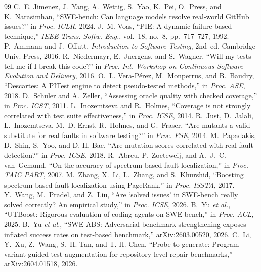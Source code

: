\documentclass[conference]{IEEEtran}
\begin{document}

\begin{thebibliography}{99}
 C.~E. Jimenez, J.~Yang, A.~Wettig, S.~Yao, K.~Pei, O.~Press, and K.~Narasimhan, ``SWE-bench: Can language models resolve real-world GitHub issues?'' in \emph{Proc. ICLR}, 2024.
 J.~M. Voas, ``PIE: A dynamic failure-based technique,'' \emph{IEEE Trans. Softw. Eng.}, vol.~18, no.~8, pp.~717--727, 1992.
 P.~Ammann and J.~Offutt, \emph{Introduction to Software Testing}, 2nd~ed. Cambridge Univ. Press, 2016.
 R.~Niedermayr, E.~Juergens, and S.~Wagner, ``Will my tests tell me if I break this code?'' in \emph{Proc. Int. Workshop on Continuous Software Evolution and Delivery}, 2016.
 O.~L. Vera-P\'erez, M.~Monperrus, and B.~Baudry, ``Descartes: A PITest engine to detect pseudo-tested methods,'' in \emph{Proc. ASE}, 2018.
 D.~Schuler and A.~Zeller, ``Assessing oracle quality with checked coverage,'' in \emph{Proc. ICST}, 2011.
 L.~Inozemtseva and R.~Holmes, ``Coverage is not strongly correlated with test suite effectiveness,'' in \emph{Proc. ICSE}, 2014.
 R.~Just, D.~Jalali, L.~Inozemtseva, M.~D. Ernst, R.~Holmes, and G.~Fraser, ``Are mutants a valid substitute for real faults in software testing?'' in \emph{Proc. FSE}, 2014.
 M.~Papadakis, D.~Shin, S.~Yoo, and D.-H. Bae, ``Are mutation scores correlated with real fault detection?'' in \emph{Proc. ICSE}, 2018.
 R.~Abreu, P.~Zoeteweij, and A.~J.~C. van~Gemund, ``On the accuracy of spectrum-based fault localization,'' in \emph{Proc. TAIC PART}, 2007.
 M.~Zhang, X.~Li, L.~Zhang, and S.~Khurshid, ``Boosting spectrum-based fault localization using PageRank,'' in \emph{Proc. ISSTA}, 2017.
 Y.~Wang, M.~Pradel, and Z.~Liu, ``Are `solved issues' in SWE-bench really solved correctly? An empirical study,'' in \emph{Proc. ICSE}, 2026.
 B.~Yu \emph{et al.}, ``UTBoost: Rigorous evaluation of coding agents on SWE-bench,'' in \emph{Proc. ACL}, 2025.
 B.~Yu \emph{et al.}, ``SWE-ABS: Adversarial benchmark strengthening exposes inflated success rates on test-based benchmark,'' arXiv:2603.00520, 2026.
 C.~Li, Y.~Xu, Z.~Wang, S.~H. Tan, and T.-H. Chen, ``Probe to generate: Program variant-guided test augmentation for repository-level repair benchmarks,'' arXiv:2604.01518, 2026.

\end{thebibliography}
\end{document}
